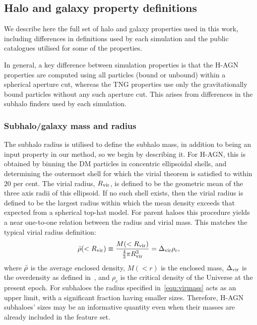 \documentclass[usenatbib,useAMS]{mnras}
\begin{document}
\subsection{Halo and galaxy property definitions}\label{sec:halo_galaxy_defs}

We describe here the full set of halo and galaxy properties used in this work, including differences in definitions used by each simulation and the public catalogues utilised for some of the properties.

In general, a key difference between simulation properties is that the H-AGN properties are computed using all particles (bound or unbound) within a spherical aperture cut, whereas the TNG properties use only the gravitationally bound particles without any such aperture cut. This arises from differences in the subhalo finders used by each simulation.

\subsubsection{Subhalo/galaxy mass and radius}\label{sec:Mass_Radius}

The subhalo radius is utilised to define the subhalo mass, in addition to being an input property in our method, so we begin by describing it. For H-AGN, this is obtained by binning the DM particles in concentric ellipsoidal shells, and determining the outermost shell for which the virial theorem is satisfied to within $20$ per cent. The virial radius, $R_{\rm vir}$, is defined to be the geometric mean of the three axis radii of this ellipsoid. If no such shell exists, then the virial radius is defined to be the largest radius within which the mean density exceeds that expected from a spherical top-hat model. For parent haloes this procedure yields a near one-to-one relation between the radius and virial mass. This matches the typical virial radius definition:
% 
\begin{equation}\label{eqn:virmass}
    \Bar{\rho}(<R_{\rm vir}) \equiv \frac{M(<R_{\rm vir})}{\frac{4}{3}\pi R_{\rm vir}^3} = \Delta_{\rm vir}\rho_c,
\end{equation}
% 
where $\Bar{\rho}$ is the average enclosed density, $M(<r)$ is the enclosed mass, $\Delta_{\rm vir}$ is the overdensity as defined in~\citet{BryanNorman1998}, and $\rho_c$ is the critical density of the Universe at the present epoch. For subhaloes the radius specified in~\cref{eqn:virmass} acts as an upper limit, with a significant fraction having smaller sizes. Therefore, H-AGN subhaloes' sizes may be an informative quantity even when their masses are already included in the feature set. %
\end{document}
